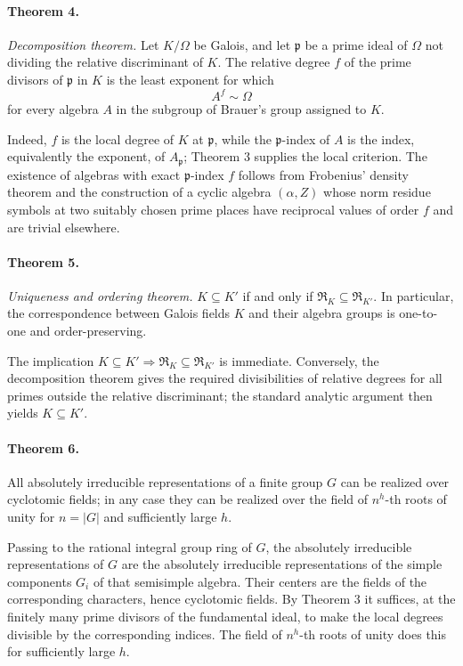 \documentclass[11pt]{article}
\providecommand{\Om}{\Omega}
\begin{document}
\paragraph{Theorem 4.}
\emph{Decomposition theorem.} Let \(K/\Om\) be Galois, and let \(\mathfrak p\) be a prime ideal of \(\Om\) not dividing the relative discriminant of \(K\). The relative degree \(f\) of the prime divisors of \(\mathfrak p\) in \(K\) is the least exponent for which
\[
        A^f\sim\Om
\]
for every algebra \(A\) in the subgroup of Brauer's group assigned to \(K\).

Indeed, \(f\) is the local degree of \(K\) at \(\mathfrak p\), while the \(\mathfrak p\)-index of \(A\) is the index, equivalently the exponent, of \(A_{\mathfrak p}\); Theorem 3 supplies the local criterion. The existence of algebras with exact \(\mathfrak p\)-index \(f\) follows from Frobenius' density theorem and the construction of a cyclic algebra \((\alpha,Z)\) whose norm residue symbols at two suitably chosen prime places have reciprocal values of order \(f\) and are trivial elsewhere.

\paragraph{Theorem 5.}
\emph{Uniqueness and ordering theorem.} \(K\subseteq K'\) if and only if \(\mathfrak R_K\subseteq\mathfrak R_{K'}\). In particular, the correspondence between Galois fields \(K\) and their algebra groups is one-to-one and order-preserving.

The implication \(K\subseteq K'\Rightarrow\mathfrak R_K\subseteq\mathfrak R_{K'}\) is immediate. Conversely, the decomposition theorem gives the required divisibilities of relative degrees for all primes outside the relative discriminant; the standard analytic argument then yields \(K\subseteq K'\).

\paragraph{Theorem 6.}
All absolutely irreducible representations of a finite group \(G\) can be realized over cyclotomic fields; in any case they can be realized over the field of \(n^h\)-th roots of unity for \(n=|G|\) and sufficiently large \(h\).

Passing to the rational integral group ring of \(G\), the absolutely irreducible representations of \(G\) are the absolutely irreducible representations of the simple components \(G_i\) of that semisimple algebra. Their centers are the fields of the corresponding characters, hence cyclotomic fields. By Theorem 3 it suffices, at the finitely many prime divisors of the fundamental ideal, to make the local degrees divisible by the corresponding indices. The field of \(n^h\)-th roots of unity does this for sufficiently large \(h\).
\end{document}
